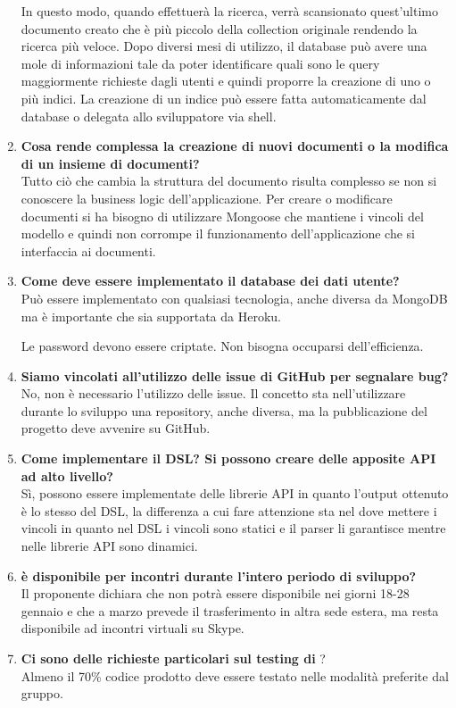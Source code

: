 \begin{enumerate}
In questo modo, quando effettuerà la ricerca, verrà scansionato quest'ultimo documento creato che è più piccolo della collection originale rendendo la ricerca più veloce.	 
Dopo diversi mesi di utilizzo, il database può avere una mole di informazioni tale da poter identificare quali sono le query
maggiormente richieste dagli utenti e quindi proporre la creazione di uno o più indici.
La creazione di un indice può essere fatta automaticamente dal database o delegata allo sviluppatore via shell.
		
		\item
		{\bfseries Cosa rende complessa la creazione di nuovi documenti o la modifica di un insieme di documenti?} \\
		Tutto ciò che cambia la struttura del documento risulta complesso se non si conoscere la business logic dell'applicazione.
		Per creare o modificare documenti si ha bisogno di utilizzare Mongoose che mantiene i vincoli del modello e quindi non corrompe il funzionamento dell'applicazione che si interfaccia ai documenti.
		
		\item
		{\bfseries Come deve essere implementato il database dei dati utente?} \\
		Può essere implementato con qualsiasi tecnologia, anche diversa da MongoDB ma è importante che sia supportata da Heroku.
		
		Le password devono essere criptate.
		Non bisogna occuparsi dell'efficienza.
		
		\item
		{\bfseries Siamo vincolati all'utilizzo delle issue di GitHub per segnalare bug?} \\
		No, non è necessario l'utilizzo delle issue. 
		Il concetto sta nell'utilizzare durante lo sviluppo una repository, anche diversa, ma la pubblicazione del
		progetto deve avvenire su GitHub.
		
		\item
		{\bfseries Come implementare il DSL? Si possono creare delle apposite API ad alto livello?} \\
		Sì, possono essere implementate delle librerie API in quanto l'output ottenuto è lo stesso del DSL, la differenza a cui 	fare attenzione sta nel dove mettere i vincoli in quanto nel DSL i vincoli sono statici e il parser li garantisce mentre nelle librerie API sono dinamici.
		
		\item
		{\bfseries \Proponente{} è disponibile per incontri durante l'intero periodo di sviluppo?} \\
		Il proponente dichiara che non potrà essere disponibile nei giorni 18-28 gennaio e che a marzo prevede il trasferimento in
		altra sede estera, ma resta disponibile ad incontri virtuali su Skype.
				
		\item
		{\bfseries Ci sono delle richieste particolari sul testing di \ProjectName{}}? \\
		Almeno il 70\% codice prodotto deve essere testato nelle modalità preferite dal gruppo.
		
	\end{enumerate}
	
